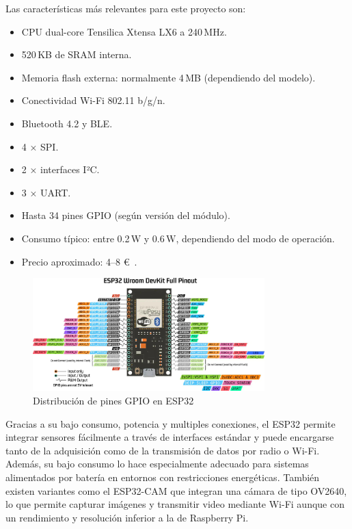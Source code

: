 \begin{itemize}
    Las características más relevantes para este proyecto son:
    \begin{itemize}
        \item CPU dual-core Tensilica Xtensa LX6 a 240\,MHz.
        \item 520\,KB de SRAM interna.
        \item Memoria flash externa: normalmente 4\,MB (dependiendo del modelo).
        \item Conectividad Wi-Fi 802.11 b/g/n.
        \item Bluetooth 4.2 y BLE.
        \item 4 × SPI.
        \item 2 × interfaces I²C.
        \item 3 × UART.
        \item Hasta 34 pines GPIO (según versión del módulo).
        \item Consumo típico: entre 0.2\,W y 0.6\,W, dependiendo del modo de operación.
        \item Precio aproximado: 4–8 €~\cite{esp32}.
    \end{itemize}
    \begin{figure}[h]
        \centering
        \includegraphics[width=0.8\textwidth]{Imagenes/Bitmap/esp32gpio}
        \caption{Distribución de pines GPIO en ESP32}
        \label{fig:esp32gpio}
    \end{figure}

    Gracias a su bajo consumo, potencia y multiples conexiones, el ESP32 permite integrar sensores fácilmente a través de interfaces estándar y puede encargarse tanto de la adquisición como de la transmisión de datos por radio o Wi-Fi.
    Además, su bajo consumo lo hace especialmente adecuado para sistemas alimentados por batería en entornos con restricciones energéticas.
    También existen variantes como el ESP32-CAM que integran una cámara de tipo OV2640, lo que permite capturar imágenes y transmitir video mediante Wi-Fi
    aunque con un rendimiento y resolución inferior a la de Raspberry Pi.


\end{itemize}
